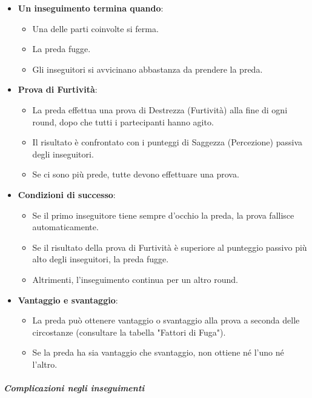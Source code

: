\begin{itemize}
    \item \textbf{Un inseguimento termina quando}: 
    \begin{itemize}
        \item Una delle parti coinvolte si ferma.
        \item La preda fugge.
        \item Gli inseguitori si avvicinano abbastanza da prendere la preda.
    \end{itemize}
    \item \textbf{Prova di Furtività}: 
    \begin{itemize}
        \item La preda effettua una prova di Destrezza (Furtività) alla fine di ogni round, dopo che tutti i partecipanti hanno agito.
        \item Il risultato è confrontato con i punteggi di Saggezza (Percezione) passiva degli inseguitori.
        \item Se ci sono più prede, tutte devono effettuare una prova.
    \end{itemize}
    \item \textbf{Condizioni di successo}: 
    \begin{itemize}
        \item Se il primo inseguitore tiene sempre d'occhio la preda, la prova fallisce automaticamente.
        \item Se il risultato della prova di Furtività è superiore al punteggio passivo più alto degli inseguitori, la preda fugge.
        \item Altrimenti, l'inseguimento continua per un altro round.
    \end{itemize}
    \item \textbf{Vantaggio e svantaggio}: 
    \begin{itemize}
        \item La preda può ottenere vantaggio o svantaggio alla prova a seconda delle circostanze (consultare la tabella "Fattori di Fuga").
        \item Se la preda ha sia vantaggio che svantaggio, non ottiene né l'uno né l'altro.
    \end{itemize}
\end{itemize}

\subparagraph*{Complicazioni negli inseguimenti}

